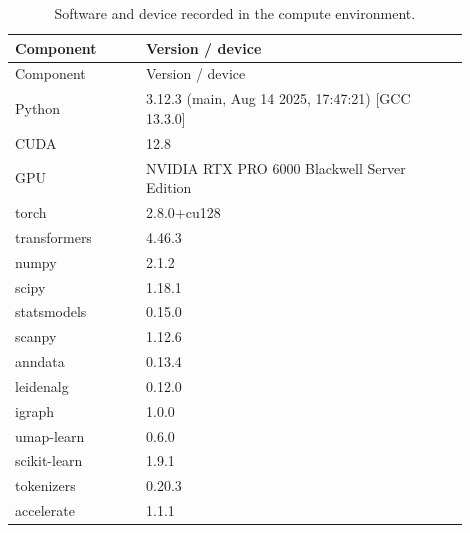 \begin{longtable}{@{}L{0.26\linewidth}L{0.64\linewidth}@{}}
\caption{Software and device recorded in the compute environment.}\\
\toprule
Component & Version / device \\
\midrule
\endfirsthead
\toprule
Component & Version / device \\
\midrule
\endhead
\endfoot
\bottomrule
\endlastfoot
Python & 3.12.3 (main, Aug 14 2025, 17:47:21) [GCC 13.3.0] \\
CUDA & 12.8 \\
GPU & NVIDIA RTX PRO 6000 Blackwell Server Edition \\
torch & 2.8.0+cu128 \\
transformers & 4.46.3 \\
numpy & 2.1.2 \\
scipy & 1.18.1 \\
statsmodels & 0.15.0 \\
scanpy & 1.12.6 \\
anndata & 0.13.4 \\
leidenalg & 0.12.0 \\
igraph & 1.0.0 \\
umap-learn & 0.6.0 \\
scikit-learn & 1.9.1 \\
tokenizers & 0.20.3 \\
accelerate & 1.1.1 \\
\end{longtable}
